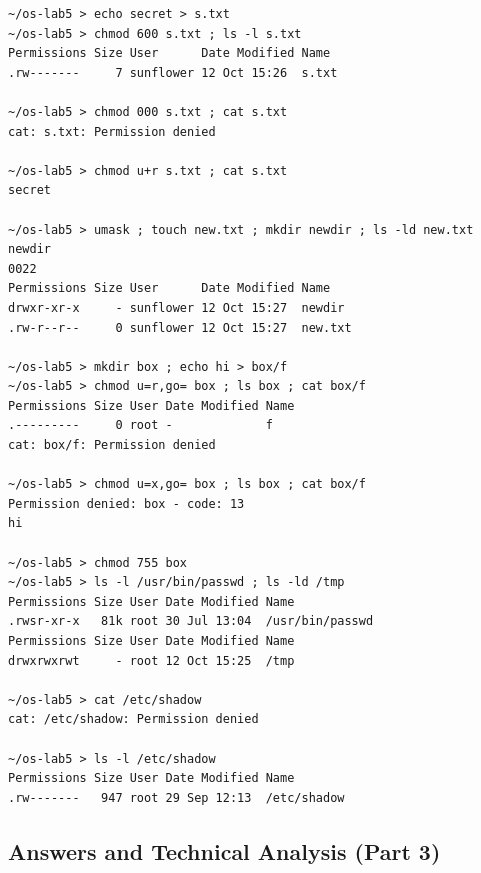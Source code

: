 \documentclass[12pt,a4paper]{article}
\begin{document}
\begin{lstlisting}[style=consolestyle]
~/os-lab5 > echo secret > s.txt
~/os-lab5 > chmod 600 s.txt ; ls -l s.txt
Permissions Size User      Date Modified Name
.rw-------     7 sunflower 12 Oct 15:26  s.txt

~/os-lab5 > chmod 000 s.txt ; cat s.txt
cat: s.txt: Permission denied

~/os-lab5 > chmod u+r s.txt ; cat s.txt
secret

~/os-lab5 > umask ; touch new.txt ; mkdir newdir ; ls -ld new.txt newdir
0022
Permissions Size User      Date Modified Name
drwxr-xr-x     - sunflower 12 Oct 15:27  newdir
.rw-r--r--     0 sunflower 12 Oct 15:27  new.txt

~/os-lab5 > mkdir box ; echo hi > box/f
~/os-lab5 > chmod u=r,go= box ; ls box ; cat box/f
Permissions Size User Date Modified Name
.---------     0 root -             f
cat: box/f: Permission denied

~/os-lab5 > chmod u=x,go= box ; ls box ; cat box/f
Permission denied: box - code: 13
hi

~/os-lab5 > chmod 755 box
~/os-lab5 > ls -l /usr/bin/passwd ; ls -ld /tmp
Permissions Size User Date Modified Name
.rwsr-xr-x   81k root 30 Jul 13:04  /usr/bin/passwd
Permissions Size User Date Modified Name
drwxrwxrwt     - root 12 Oct 15:25  /tmp

~/os-lab5 > cat /etc/shadow
cat: /etc/shadow: Permission denied

~/os-lab5 > ls -l /etc/shadow
Permissions Size User Date Modified Name
.rw-------   947 root 29 Sep 12:13  /etc/shadow
\end{lstlisting}

\subsection{Answers and Technical Analysis (Part 3)}
\end{document}
